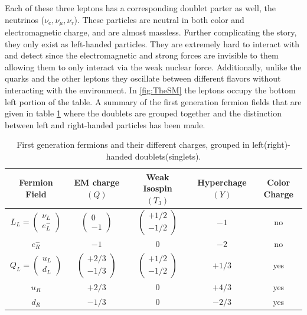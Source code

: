 Each of these three leptons has a corresponding doublet parter as well, the neutrinos ($\nu_{e}, \nu_{\mu}, \nu_{\tau}$). These particles are neutral in both color and electromagnetic charge, and are almost massless. Further complicating the story, they only exist as left-handed particles. They are extremely hard to interact with and detect since the electromagnetic and strong forces are invisible to them allowing them to only interact via the weak nuclear force. Additionally, unlike the quarks and the other leptons they oscillate between different flavors without interacting with the environment. In \ref{fig:TheSM} the leptons occupy the bottom left portion of the table. A summary of the first generation fermion fields that are given in table \ref{tab:FermionFields} where the doublets are grouped together and the distinction between left and right-handed particles has been made.

\begin{table}
\begin{center}
\begin{tabular}{c|c|c|c||c}
\hline 
\hline
Fermion Field & EM charge $\left(Q\right)$ & Weak Isospin $\left(T_{3}\right)$ & Hyperchage $\left(Y\right)$ & Color Charge \\ \hline
$L_{L} = \begin{pmatrix} \nu_{L} \\ e^{-}_{L} \end{pmatrix}$ & $\begin{pmatrix} 0 \\ -1 \end{pmatrix}$ & $\begin{pmatrix} +1/2 \\ -1/2 \end{pmatrix}$ & $-1$ & no \\
$e_{R}^{-}$ & $-1$ & $0$ & $-2$ & no \\
\hline
$Q_{L} = \begin{pmatrix} u_{L} \\ d_{L} \end{pmatrix}$ & $\begin{pmatrix} +2/3 \\ -1/3 \end{pmatrix}$ & $\begin{pmatrix} +1/2 \\ -1/2 \end{pmatrix}$ & $+1/3$ & yes \\
$u_{R}$ & $+2/3$ & $0$ & $+4/3$ & yes \\
$d_{R}$ & $-1/3$ & $0$ & $-2/3$ & yes \\
\hline
\hline
\end{tabular}
\end{center}
\caption{First generation fermions and their different charges, grouped in left(right)-handed doublets(singlets).}
\label{tab:FermionFields}
\end{table}


